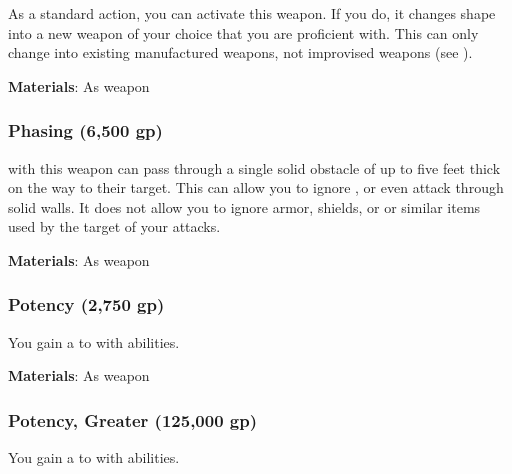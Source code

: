 As a standard action, you can activate this weapon.
If you do, it changes shape into a new weapon of your choice that you are proficient with.
This can only change into existing manufactured weapons, not improvised weapons (see ).



\vspace{0.25em}
\textbf{Materials}: As weapon


\lowercase{\hypertarget{item:Phasing}{}}\label{item:Phasing}
\hypertarget{item:Phasing}{\subsubsection{Phasing\hfill{} (6,500 gp)}}

 with this weapon can pass through a single solid obstacle of up to five feet thick on the way to their target.
This can allow you to ignore , or even attack through solid walls.
It does not allow you to ignore armor, shields, or or similar items used by the target of your attacks.



\vspace{0.25em}
\textbf{Materials}: As weapon


\lowercase{\hypertarget{item:Potency}{}}\label{item:Potency}
\hypertarget{item:Potency}{\subsubsection{Potency\hfill{} (2,750 gp)}}

You gain a   to  with  abilities.



\vspace{0.25em}
\textbf{Materials}: As weapon


\lowercase{\hypertarget{item:Potency, Greater}{}}\label{item:Potency, Greater}
\hypertarget{item:Potency, Greater}{\subsubsection{Potency, Greater\hfill{} (125,000 gp)}}

You gain a   to  with  abilities.



